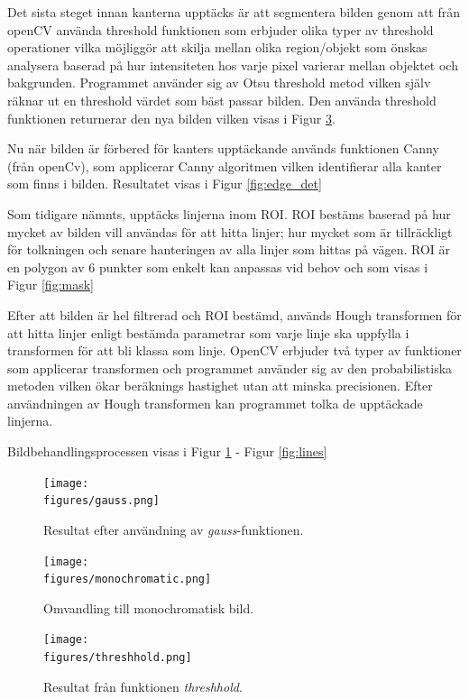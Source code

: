 \documentclass[tekniskrapport/tech.tex]{subfiles}
\begin{document}
Det sista steget innan kanterna upptäcks är att segmentera bilden genom att
från openCV använda threshold funktionen som erbjuder olika typer av threshold
operationer vilka möjliggör att skilja mellan olika region/objekt som önskas
analysera baserad på hur intensiteten hos varje pixel varierar mellan objektet
och bakgrunden. Programmet använder sig av Otsu threshold metod vilken själv
räknar ut en threshold värdet som bäst passar bilden. Den använda threshold
funktionen returnerar den nya bilden vilken visas i Figur
\ref{fig:threshhold}.

Nu när bilden är förbered för kanters upptäckande används funktionen Canny
(från openCv), som applicerar Canny algoritmen vilken identifierar alla kanter
som finns i bilden. Resultatet visas i Figur \ref{fig:edge_det}

Som tidigare nämnts, upptäcks linjerna inom ROI. ROI bestäms baserad på hur
mycket av bilden vill användas för att hitta linjer; hur mycket som är
tillräckligt för tolkningen och senare hanteringen av alla linjer som hittas på
vägen. ROI är en polygon av 6 punkter som enkelt kan anpassas vid behov och som
visas i Figur \ref{fig:mask}

Efter att bilden är hel filtrerad och ROI bestämd, används Hough transformen
för att hitta linjer enligt bestämda parametrar som varje linje ska uppfylla i
transformen för att bli klassa som linje. OpenCV erbjuder två typer av
funktioner som applicerar transformen och programmet använder sig av den
probabilistiska metoden vilken ökar beräknings hastighet utan att minska
precisionen. Efter användningen av Hough transformen kan programmet tolka de
upptäckade linjerna.

Bildbehandlingsprocessen visas i Figur \ref{fig:gauss} - Figur \ref{fig:lines}

\begin{figure}[H]
    \centering
    \texttt{[image: \\figures/gauss.png]}
    \caption{Resultat efter användning av \textit{gauss}-funktionen.}
    \label{fig:gauss}
\end{figure}

\begin{figure}[H]
    \centering
    \texttt{[image: \\figures/monochromatic.png]}
    \caption{Omvandling till monochromatisk bild.}
    \label{fig:monochromatic}
\end{figure}

\begin{figure}[H]
    \centering
    \texttt{[image: \\figures/threshhold.png]}
    \caption{Resultat från funktionen \textit{threshhold}.}
    \label{fig:threshhold}
\end{figure}
\end{document}
